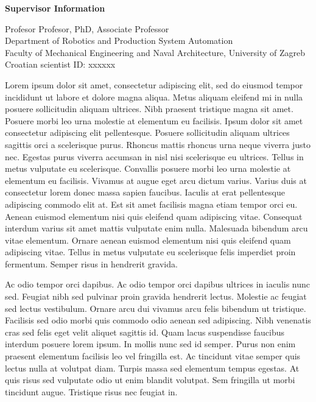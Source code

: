 \newpage
\clearpage
\ifpdf
{}
\fi
\pagestyle{empty}
\begin{center}
	\textbf{\large Supervisor Information}
\end{center}


\begin{flushleft}
Profesor Profesor, PhD, Associate Professor\\
Department of Robotics and Production System Automation\\
Faculty of Mechanical Engineering and Naval Architecture, University of Zagreb\\
Croatian scientist ID: xxxxxx


\end{flushleft}


Lorem ipsum dolor sit amet, consectetur adipiscing elit, sed do eiusmod tempor incididunt ut labore et dolore magna aliqua. Metus aliquam eleifend mi in nulla posuere sollicitudin aliquam ultrices. Nibh praesent tristique magna sit amet. Posuere morbi leo urna molestie at elementum eu facilisis. Ipsum dolor sit amet consectetur adipiscing elit pellentesque. Posuere sollicitudin aliquam ultrices sagittis orci a scelerisque purus. Rhoncus mattis rhoncus urna neque viverra justo nec. Egestas purus viverra accumsan in nisl nisi scelerisque eu ultrices. Tellus in metus vulputate eu scelerisque. Convallis posuere morbi leo urna molestie at elementum eu facilisis. Vivamus at augue eget arcu dictum varius. Varius duis at consectetur lorem donec massa sapien faucibus. Iaculis at erat pellentesque adipiscing commodo elit at. Est sit amet facilisis magna etiam tempor orci eu. Aenean euismod elementum nisi quis eleifend quam adipiscing vitae. Consequat interdum varius sit amet mattis vulputate enim nulla. Malesuada bibendum arcu vitae elementum. Ornare aenean euismod elementum nisi quis eleifend quam adipiscing vitae. Tellus in metus vulputate eu scelerisque felis imperdiet proin fermentum. Semper risus in hendrerit gravida.

Ac odio tempor orci dapibus. Ac odio tempor orci dapibus ultrices in iaculis nunc sed. Feugiat nibh sed pulvinar proin gravida hendrerit lectus. Molestie ac feugiat sed lectus vestibulum. Ornare arcu dui vivamus arcu felis bibendum ut tristique. Facilisis sed odio morbi quis commodo odio aenean sed adipiscing. Nibh venenatis cras sed felis eget velit aliquet sagittis id. Quam lacus suspendisse faucibus interdum posuere lorem ipsum. In mollis nunc sed id semper. Purus non enim praesent elementum facilisis leo vel fringilla est. Ac tincidunt vitae semper quis lectus nulla at volutpat diam. Turpis massa sed elementum tempus egestas. At quis risus sed vulputate odio ut enim blandit volutpat. Sem fringilla ut morbi tincidunt augue. Tristique risus nec feugiat in.

